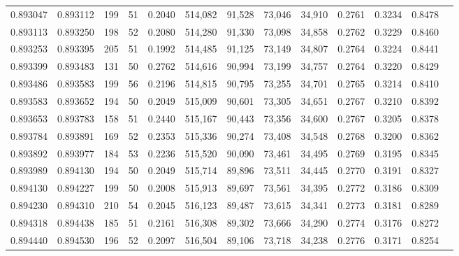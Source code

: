 \begin{tabular}{rrrrrrrrrrrrr}
0.893047 & 0.893112 &   199 &  51 &                                     0.2040 & 514,082 &  91,528 &  73,046 &  34,910 & 0.2761 & 0.3234 & 0.8478 \\
0.893113 & 0.893250 &   198 &  52 &                                     0.2080 & 514,280 &  91,330 &  73,098 &  34,858 & 0.2762 & 0.3229 & 0.8460 \\
0.893253 & 0.893395 &   205 &  51 &                                     0.1992 & 514,485 &  91,125 &  73,149 &  34,807 & 0.2764 & 0.3224 & 0.8441 \\
0.893399 & 0.893483 &   131 &  50 &                                     0.2762 & 514,616 &  90,994 &  73,199 &  34,757 & 0.2764 & 0.3220 & 0.8429 \\
0.893486 & 0.893583 &   199 &  56 &                                     0.2196 & 514,815 &  90,795 &  73,255 &  34,701 & 0.2765 & 0.3214 & 0.8410 \\
0.893583 & 0.893652 &   194 &  50 &                                     0.2049 & 515,009 &  90,601 &  73,305 &  34,651 & 0.2767 & 0.3210 & 0.8392 \\
0.893653 & 0.893783 &   158 &  51 &                                     0.2440 & 515,167 &  90,443 &  73,356 &  34,600 & 0.2767 & 0.3205 & 0.8378 \\
0.893784 & 0.893891 &   169 &  52 &                                     0.2353 & 515,336 &  90,274 &  73,408 &  34,548 & 0.2768 & 0.3200 & 0.8362 \\
0.893892 & 0.893977 &   184 &  53 &                                     0.2236 & 515,520 &  90,090 &  73,461 &  34,495 & 0.2769 & 0.3195 & 0.8345 \\
0.893989 & 0.894130 &   194 &  50 &                                     0.2049 & 515,714 &  89,896 &  73,511 &  34,445 & 0.2770 & 0.3191 & 0.8327 \\
0.894130 & 0.894227 &   199 &  50 &                                     0.2008 & 515,913 &  89,697 &  73,561 &  34,395 & 0.2772 & 0.3186 & 0.8309 \\
0.894230 & 0.894310 &   210 &  54 &                                     0.2045 & 516,123 &  89,487 &  73,615 &  34,341 & 0.2773 & 0.3181 & 0.8289 \\
0.894318 & 0.894438 &   185 &  51 &                                     0.2161 & 516,308 &  89,302 &  73,666 &  34,290 & 0.2774 & 0.3176 & 0.8272 \\
0.894440 & 0.894530 &   196 &  52 &                                     0.2097 & 516,504 &  89,106 &  73,718 &  34,238 & 0.2776 & 0.3171 & 0.8254 \\

\end{tabular}
